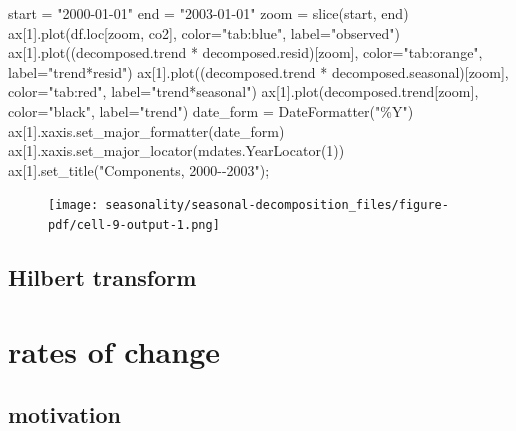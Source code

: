 \documentclass[
  letterpaper,
  DIV=11,
  numbers=noendperiod,
  oneside]{scrreprt}
\newenvironment{Shaded}{\begin{snugshade}}{\end{snugshade}}
\newcommand{\BuiltInTok}[1]{\textcolor[rgb]{0.00,0.23,0.31}{#1}}
\newcommand{\DecValTok}[1]{\textcolor[rgb]{0.68,0.00,0.00}{#1}}
\newcommand{\NormalTok}[1]{\textcolor[rgb]{0.00,0.23,0.31}{#1}}
\newcommand{\OperatorTok}[1]{\textcolor[rgb]{0.37,0.37,0.37}{#1}}
\newcommand{\StringTok}[1]{\textcolor[rgb]{0.13,0.47,0.30}{#1}}
\begin{document}
\begin{Shaded}
\begin{Highlighting}[]
\NormalTok{start }\OperatorTok{=} \StringTok{"2000{-}01{-}01"}
\NormalTok{end }\OperatorTok{=} \StringTok{"2003{-}01{-}01"}
\NormalTok{zoom }\OperatorTok{=} \BuiltInTok{slice}\NormalTok{(start, end)}
\NormalTok{ax[}\DecValTok{1}\NormalTok{].plot(df.loc[zoom, }\StringTok{\textquotesingle{}co2\textquotesingle{}}\NormalTok{], color}\OperatorTok{=}\StringTok{"tab:blue"}\NormalTok{, label}\OperatorTok{=}\StringTok{"observed"}\NormalTok{)}
\NormalTok{ax[}\DecValTok{1}\NormalTok{].plot((decomposed.trend }\OperatorTok{*}\NormalTok{ decomposed.resid)[zoom], color}\OperatorTok{=}\StringTok{"tab:orange"}\NormalTok{, label}\OperatorTok{=}\StringTok{"trend*resid"}\NormalTok{)}
\NormalTok{ax[}\DecValTok{1}\NormalTok{].plot((decomposed.trend }\OperatorTok{*}\NormalTok{ decomposed.seasonal)[zoom], color}\OperatorTok{=}\StringTok{"tab:red"}\NormalTok{, label}\OperatorTok{=}\StringTok{"trend*seasonal"}\NormalTok{)}
\NormalTok{ax[}\DecValTok{1}\NormalTok{].plot(decomposed.trend[zoom], color}\OperatorTok{=}\StringTok{"black"}\NormalTok{, label}\OperatorTok{=}\StringTok{"trend"}\NormalTok{)}
\NormalTok{date\_form }\OperatorTok{=}\NormalTok{ DateFormatter(}\StringTok{"\%Y"}\NormalTok{)}
\NormalTok{ax[}\DecValTok{1}\NormalTok{].xaxis.set\_major\_formatter(date\_form)}
\NormalTok{ax[}\DecValTok{1}\NormalTok{].xaxis.set\_major\_locator(mdates.YearLocator(}\DecValTok{1}\NormalTok{))}
\NormalTok{ax[}\DecValTok{1}\NormalTok{].set\_title(}\StringTok{"Components, 2000{-}{-}2003"}\NormalTok{)}\OperatorTok{;}
\end{Highlighting}
\end{Shaded}

\begin{figure}[H]

{\centering \texttt{[image: seasonality/seasonal-decomposition\_files/figure-pdf/cell-9-output-1.png]}

}

\end{figure}

\hypertarget{hilbert-transform}{%
\chapter{Hilbert transform}\label{hilbert-transform}}

\part{rates of change}

\hypertarget{motivation-8}{%
\chapter{motivation}\label{motivation-8}}
\end{document}
